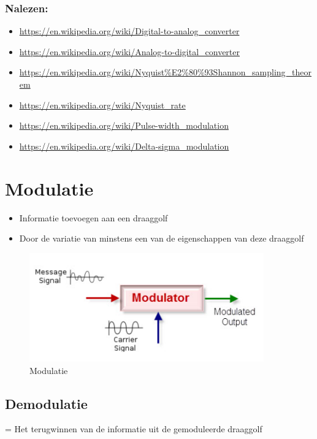 \documentclass{article}
\begin{document}
\subsubsection{Nalezen:}
\begin{itemize}
    \item \url{https://en.wikipedia.org/wiki/Digital-to-analog_converter}
    \item \url{https://en.wikipedia.org/wiki/Analog-to-digital_converter}
    \item \url{https://en.wikipedia.org/wiki/Nyquist%E2%80%93Shannon_sampling_theorem}
    \item \url{https://en.wikipedia.org/wiki/Nyquist_rate}
    \item \url{https://en.wikipedia.org/wiki/Pulse-width_modulation}
    \item \url{https://en.wikipedia.org/wiki/Delta-sigma_modulation}
\end{itemize}

\section{Modulatie}
\begin{itemize}
    \item Informatie toevoegen aan een draaggolf
    \item Door de variatie van minstens een van de eigenschappen van deze draaggolf
\end{itemize}

\begin{figure}[H]
    \centering
    \includegraphics[width=0.9\textwidth]{Screenshot_20200302_115326.png}
    \caption{Modulatie}
\end{figure}

\subsection{Demodulatie}
= Het terugwinnen van de informatie uit de gemoduleerde draaggolf
\end{document}
